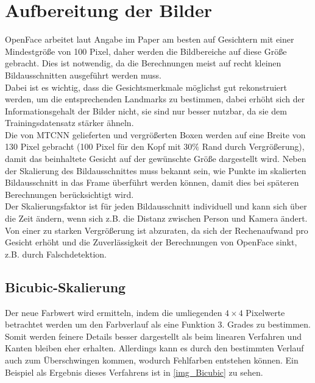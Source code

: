 \section{Aufbereitung der Bilder}
\label{scale_Algos}
OpenFace arbeitet laut Angabe im Paper \cite{OpenFace} am besten auf Gesichtern mit einer Mindestgröße von 100 Pixel, daher werden die Bildbereiche auf diese Größe gebracht. Dies ist notwendig, da die Berechnungen meist auf recht kleinen Bildausschnitten ausgeführt werden muss.\\
Dabei ist es wichtig, dass die Gesichtsmerkmale möglichst gut rekonstruiert werden, um die entsprechenden Landmarks zu bestimmen, dabei erhöht sich der Informationsgehalt der Bilder nicht, sie sind nur besser nutzbar, da sie dem Trainingsdatensatz stärker ähneln.\\
Die von MTCNN gelieferten und vergrößerten Boxen werden auf eine Breite von 130 Pixel gebracht (100 Pixel für den Kopf mit $30\%$ Rand durch Vergrößerung), damit das beinhaltete Gesicht auf der gewünschte Größe dargestellt wird. Neben der Skalierung des Bildausschnittes muss bekannt sein, wie Punkte im skalierten Bildausschnitt in das Frame überführt werden können, damit dies bei späteren Berechnungen berücksichtigt wird.\\
Der Skalierungsfaktor ist für jeden Bildausschnitt individuell und kann sich über die Zeit ändern, wenn sich z.B. die Distanz zwischen Person und Kamera ändert. Von einer zu starken Vergrößerung ist abzuraten, da sich der Rechenaufwand pro Gesicht erhöht und die Zuverlässigkeit der Berechnungen von OpenFace sinkt, z.B. durch Falschdetektion.
\subsection{Bicubic-Skalierung}
Der neue Farbwert wird ermitteln, indem die umliegenden $4\times 4$ Pixelwerte betrachtet werden um den Farbverlauf als eine Funktion 3. Grades zu bestimmen. Somit werden feinere Details besser dargestellt als beim linearen Verfahren und Kanten bleiben eher erhalten. Allerdings kann es durch den bestimmten Verlauf auch zum Überschwingen kommen, wodurch Fehlfarben entstehen können. Ein Beispiel als Ergebnis dieses Verfahrens ist in \autoref{img_Bicubic} zu sehen.\\
\cite{wiki_Bicubic}
